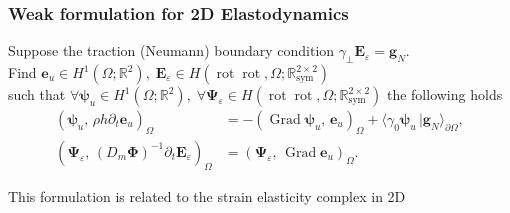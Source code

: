 \documentclass[aspectratio=169]{beamer}
\DeclareMathOperator*{\Grad}{Grad}
\DeclareMathOperator*{\rot}{rot}
\newcommand{\bbR}{\mathbb{R}}
\newcommand{\inpr}[3][]{\ensuremath{( #2, \, #3 )_{#1}}}
\newcommand{\dualpr}[3][]{\ensuremath{\langle #2 \, \vert #3 \rangle_{#1}}}
\begin{document}
\begin{frame}[fragile]\frametitle{Weak formulation for 2D Elastodynamics}
	
\begin{tcolorbox}[nobeforeafter, colframe=theme,title=$\Grad$ primal formulation]%
	Suppose the traction (Neumann) boundary condition $\gamma_\perp\bm{E}_\varepsilon = \bm{g}_N$.\\
	Find $\bm{e}_u \in H^1(\Omega; \bbR^2), \; \bm{E}_{\varepsilon} \in H(\rot\rot, \Omega; \bbR^{2\times 2}_{\text{sym}})$ \\
	such that $\forall \bm{\psi}_u \in H^1(\Omega; \bbR^2), \; \forall \bm{\Psi}_\varepsilon \in H(\rot\rot, \Omega; \bbR^{2\times 2}_{\text{sym}})$ the following holds
	\begin{equation*}
		\begin{aligned}
			\inpr[\Omega]{\bm{\psi}_u}{\rho h \partial_t \bm{e}_u} &= -\inpr[\Omega]{\Grad \bm{\psi}_u}{\bm{e}_u} + \dualpr[\partial\Omega]{\gamma_0\bm{\psi}_u}{\bm{g}_N}, \\
			\inpr[\Omega]{\bm{\Psi}_\varepsilon}{(D_m \bm{\Phi})^{-1} \partial_t \bm{E}_{\varepsilon}} &= \inpr[\Omega]{\bm{\Psi}_\varepsilon}{\Grad \bm{e}_u}.
		\end{aligned}
	\end{equation*}
 
\vspace{.5cm}

This formulation is related to the strain elasticity complex in 2D 
\begin{figure}[h]
	\centering
\end{figure}
\end{tcolorbox} 


\end{frame}
\end{document}
